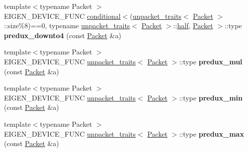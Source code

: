 \begin{DoxyCompactItemize}
\mbox{\label{namespace_eigen_1_1internal_a664161188ace876ae164eb0db6b88bfc}} 
{\footnotesize template$<$typename Packet $>$ }\\E\+I\+G\+E\+N\+\_\+\+D\+E\+V\+I\+C\+E\+\_\+\+F\+U\+NC \hyperlink{struct_eigen_1_1internal_1_1conditional}{conditional}$<$(\hyperlink{struct_eigen_1_1internal_1_1unpacket__traits}{unpacket\+\_\+traits}$<$ \hyperlink{union_eigen_1_1internal_1_1_packet}{Packet} $>$\+::size\%8)==0, typename \hyperlink{struct_eigen_1_1internal_1_1unpacket__traits}{unpacket\+\_\+traits}$<$ \hyperlink{union_eigen_1_1internal_1_1_packet}{Packet} $>$\+::\hyperlink{struct_eigen_1_1half}{half}, \hyperlink{union_eigen_1_1internal_1_1_packet}{Packet} $>$\+::type {\bfseries predux\+\_\+downto4} (const \hyperlink{union_eigen_1_1internal_1_1_packet}{Packet} \&a)
\item 
\mbox{\label{namespace_eigen_1_1internal_a72c18eeb6b62334e65831b46ab2946fc}} 
{\footnotesize template$<$typename Packet $>$ }\\E\+I\+G\+E\+N\+\_\+\+D\+E\+V\+I\+C\+E\+\_\+\+F\+U\+NC \hyperlink{struct_eigen_1_1internal_1_1unpacket__traits}{unpacket\+\_\+traits}$<$ \hyperlink{union_eigen_1_1internal_1_1_packet}{Packet} $>$\+::type {\bfseries predux\+\_\+mul} (const \hyperlink{union_eigen_1_1internal_1_1_packet}{Packet} \&a)
\item 
\mbox{\label{namespace_eigen_1_1internal_a0a98e394f4344b8927360e9f7058e17d}} 
{\footnotesize template$<$typename Packet $>$ }\\E\+I\+G\+E\+N\+\_\+\+D\+E\+V\+I\+C\+E\+\_\+\+F\+U\+NC \hyperlink{struct_eigen_1_1internal_1_1unpacket__traits}{unpacket\+\_\+traits}$<$ \hyperlink{union_eigen_1_1internal_1_1_packet}{Packet} $>$\+::type {\bfseries predux\+\_\+min} (const \hyperlink{union_eigen_1_1internal_1_1_packet}{Packet} \&a)
\item 
\mbox{\label{namespace_eigen_1_1internal_a9e64ba997e8e00469e610c767c1bd0ec}} 
{\footnotesize template$<$typename Packet $>$ }\\E\+I\+G\+E\+N\+\_\+\+D\+E\+V\+I\+C\+E\+\_\+\+F\+U\+NC \hyperlink{struct_eigen_1_1internal_1_1unpacket__traits}{unpacket\+\_\+traits}$<$ \hyperlink{union_eigen_1_1internal_1_1_packet}{Packet} $>$\+::type {\bfseries predux\+\_\+max} (const \hyperlink{union_eigen_1_1internal_1_1_packet}{Packet} \&a)

\end{DoxyCompactItemize}
